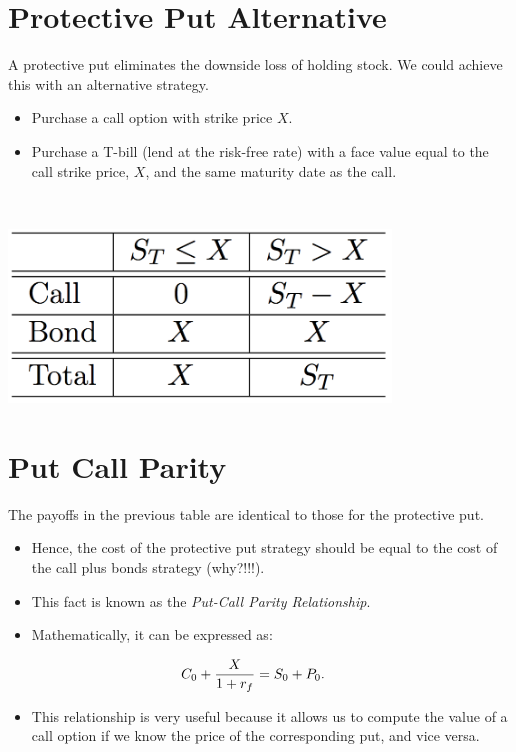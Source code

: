 \documentclass[letterpaper,10pt,english]{sphinxmanual}
\begin{document}
\section{Protective Put Alternative}
\label{options:protective-put-alternative}
A protective put eliminates the downside loss of holding stock. We
could achieve this with an alternative strategy.
\begin{itemize}
\item {} 
Purchase a call option with strike price $X$.

\end{itemize}
\begin{itemize}
\item {} 
Purchase a T-bill (lend at the risk-free rate) with a face value
equal to the call strike price, $X$, and the same maturity
date as the call.

\end{itemize}

$\qquad$

{\hfill\includegraphics[width=4in]{table7.png}\hfill}


\section{Put Call Parity}
\label{options:put-call-parity}
The payoffs in the previous table are identical to those for the
protective put.
\begin{itemize}
\item {} 
Hence, the cost of the protective put strategy should be equal to
the cost of the call plus bonds strategy (why?!!!).

\end{itemize}
\begin{itemize}
\item {} 
This fact is known as the \emph{Put-Call Parity Relationship}.

\end{itemize}
\begin{itemize}
\item {} 
Mathematically, it can be expressed as:

\end{itemize}
\begin{gather}
\begin{split}C_0 + \frac{X}{1+r_f} & = S_0 + P_0.\end{split}\notag
\end{gather}\begin{itemize}
\item {} 
This relationship is very useful because it allows us to compute the
value of a call option if we know the price of the corresponding
put, and vice versa.

\end{itemize}
\end{document}

